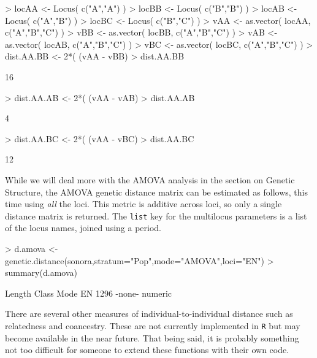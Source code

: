 \documentclass[letterpaper,twoside,openany]{book}
\begin{document}
\begin{Schunk}
\begin{Sinput}
> locAA <- Locus( c("A","A") )
> locBB <- Locus( c("B","B") )
> locAB <- Locus( c("A","B") )
> locBC <- Locus( c("B","C") )
> vAA <- as.vector( locAA, c("A","B","C") )
> vBB <- as.vector( locBB, c("A","B","C") )
> vAB <- as.vector( locAB, c("A","B","C") )
> vBC <- as.vector( locBC, c("A","B","C") )
> dist.AA.BB <- 2*( (vAA - vBB) %
> dist.AA.BB
\end{Sinput}
\begin{Soutput}
     [,1]
[1,]   16
\end{Soutput}
\begin{Sinput}
> dist.AA.AB <- 2*( (vAA - vAB) %
> dist.AA.AB
\end{Sinput}
\begin{Soutput}
     [,1]
[1,]    4
\end{Soutput}
\begin{Sinput}
> dist.AA.BC <- 2*( (vAA - vBC) %
> dist.AA.BC
\end{Sinput}
\begin{Soutput}
     [,1]
[1,]   12
\end{Soutput}
\end{Schunk}

While we will deal more with the AMOVA analysis in the section on Genetic Structure, the AMOVA genetic distance matrix can be estimated as follows, this time using \emph{all} the loci. This metric is additive across loci, so only a single distance matrix is returned.  The \texttt{list} key for the multilocus parameters is a list of the locus names, joined using a period.

\begin{Schunk}
\begin{Sinput}
> d.amova <- genetic.distance(sonora,stratum="Pop",mode="AMOVA",loci="EN")
> summary(d.amova)
\end{Sinput}
\begin{Soutput}
   Length Class  Mode   
EN 1296   -none- numeric
\end{Soutput}
\end{Schunk}


There are several other measures of individual-to-individual distance such as relatedness and coancestry.  These are not currently implemented in \texttt{R} but may become available in the near future.  That being said, it is probably something not too difficult for someone to extend these functions with their own code.
\end{document}
